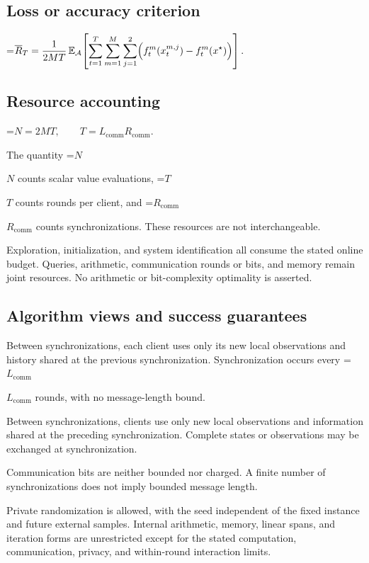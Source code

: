 \documentclass[10pt,a4paper]{article}
\newcommand{\AtlasMath}[1]{\par\begingroup\centering\setbox0=\hbox{$\displaystyle #1$}\ifdim\wd0>1.4\linewidth\typeout{ATLAS WIDE FORMULA: \the\wd0}\fi\ifdim\wd0>\linewidth\resizebox{\linewidth}{!}{\box0}\else\box0\fi\par\endgroup}
\newcommand{\AtlasInlineMath}[1]{\begingroup\setbox0=\hbox{$#1$}\ifdim\wd0>.4\linewidth\endgroup\AtlasMath{#1}\else\endgroup$#1$\fi}
\begin{document}
\subsection{Loss or accuracy criterion}

\AtlasMath{\overline R_T=\frac1{2MT}\,\mathbb{E}_{\mathcal{A}}\!\left[\sum_{t=1}^{T}\sum_{m=1}^{M}\sum_{j=1}^{2}\Bigl(f_t^m(x_t^{m,j})-f_t^m(x^\star)\Bigr)\right].}


\subsection{Resource accounting}

\AtlasMath{N=2MT,\qquad T=L_{\mathrm{comm}}R_{\mathrm{comm}}.}


The quantity \AtlasInlineMath{N} counts scalar value evaluations, \AtlasInlineMath{T} counts rounds per client, and \AtlasInlineMath{R_{\mathrm{comm}}} counts synchronizations. These resources are not interchangeable.

Exploration, initialization, and system identification all consume the stated online budget. Queries, arithmetic, communication rounds or bits, and memory remain joint resources. No arithmetic or bit-complexity optimality is asserted.

\subsection{Algorithm views and success guarantees}
Between synchronizations, each client uses only its new local observations and history shared at the previous synchronization. Synchronization occurs every \AtlasInlineMath{L_{\mathrm{comm}}} rounds, with no message-length bound.

Between synchronizations, clients use only new local observations and information shared at the preceding synchronization. Complete states or observations may be exchanged at synchronization.

Communication bits are neither bounded nor charged. A finite number of synchronizations does not imply bounded message length.

Private randomization is allowed, with the seed independent of the fixed instance and future external samples. Internal arithmetic, memory, linear spans, and iteration forms are unrestricted except for the stated computation, communication, privacy, and within-round interaction limits.
\end{document}
